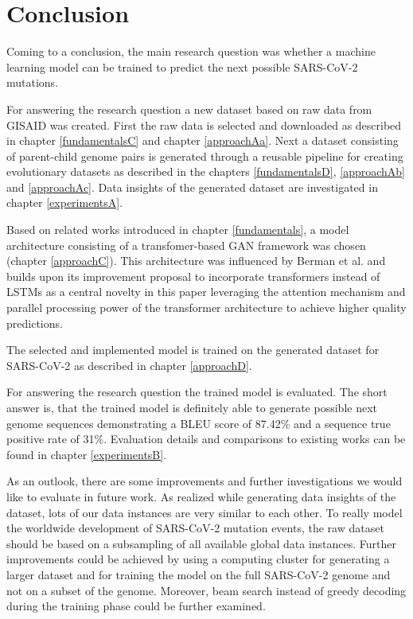 \section{Conclusion} \label{conclusion}

Coming to a conclusion, the main research question was whether a machine learning model can be trained to predict the next possible \ac{SARS-CoV-2} mutations. 

For answering the research question a new dataset based on raw data from \ac{GISAID} was created. First the raw data is selected and downloaded as described in chapter \ref{fundamentalsC} and chapter \ref{approachAa}. Next a dataset consisting of parent-child genome pairs is generated through a reusable pipeline for creating evolutionary datasets as described in the chapters \ref{fundamentalsD}, \ref{approachAb} and \ref{approachAc}. Data insights of the generated dataset are investigated in chapter \ref{experimentsA}.

Based on related works introduced in chapter \ref{fundamentals}, a model ar\-chi\-tec\-tu\-re consisting of a transfomer-based \ac{GAN} framework was chosen (chapter \ref{approachC}). This ar\-chi\-tec\-tu\-re was influenced by Berman et al. \cite{Berman2020} and builds upon its improvement proposal to incorporate transformers instead of \acp{LSTM} as a central novelty in this paper leveraging the attention mechanism and parallel processing power of the transformer architecture to achieve higher quality predictions. 

The selected and implemented model is trained on the generated dataset for \ac{SARS-CoV-2} as de\-scri\-bed in chapter \ref{approachD}.

For answering the research question the trained model is evaluated. The short answer is, that the trained model is definitely able to generate possible next genome sequences demonstrating a \ac{BLEU} score of 87.42\% and a sequence true positive rate of 31\%. Evaluation details and comparisons to existing works can be found in chapter \ref{experimentsB}.


\vspace{0.5cm}

As an outlook, there are some improvements and further investigations we would like to evaluate in future work. As realized while generating data insights of the dataset, lots of our data instances are very similar to each other. To really model the worldwide development of \ac{SARS-CoV-2} mutation events, the raw dataset should be based on a subsampling of all available global data instances. Further improvements could be achieved by using a computing cluster for generating a larger dataset and for training the model on the full \ac{SARS-CoV-2} genome and not on a subset of the genome. Moreover, beam search instead of greedy decoding during the training phase could be further examined.
